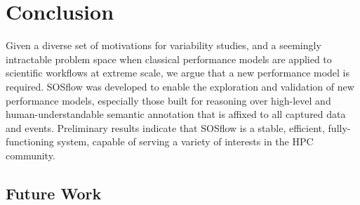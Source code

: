 
\section{Conclusion}

Given a diverse set of motivations for variability studies, and a
seemingly intractable problem space when classical performance models
are applied to scientific workflows at extreme scale, we argue that a
new performance model is required.
%
SOSflow was developed to enable the exploration and validation of new
performance models, especially those built for reasoning over
high-level and human-understandable semantic annotation that is
affixed to all captured data and events.
%
Preliminary results indicate that SOSflow is a stable, efficient,
fully-functioning system, capable of serving a variety of interests in
the HPC community.



\subsection{Future Work}

